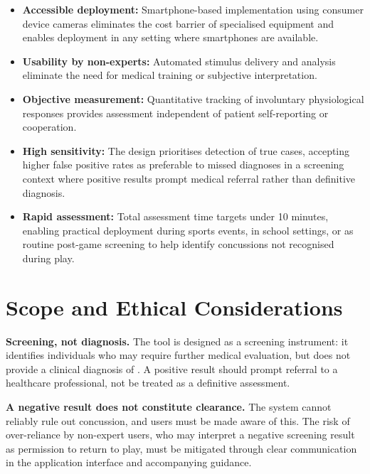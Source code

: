 \begin{itemize}
    \item \textbf{Accessible deployment:} Smartphone-based implementation using consumer device cameras eliminates the cost barrier of specialised equipment and enables deployment in any setting where smartphones are available.

    \item \textbf{Usability by non-experts:} Automated stimulus delivery and analysis eliminate the need for medical training or subjective interpretation.

    \item \textbf{Objective measurement:} Quantitative tracking of involuntary physiological responses provides assessment independent of patient self-reporting or cooperation.

    \item \textbf{High sensitivity:} The design prioritises detection of true  cases, accepting higher false positive rates as preferable to missed diagnoses in a screening context where positive results prompt medical referral rather than definitive diagnosis.

    \item \textbf{Rapid assessment:} Total assessment time targets under 10 minutes, enabling practical deployment during sports events, in school settings, or as routine post-game screening to help identify concussions not recognised during play.
\end{itemize}


\section{Scope and Ethical Considerations}

\textbf{Screening, not diagnosis.} The tool is designed as a screening instrument: it identifies individuals who may require further medical evaluation, but does not provide a clinical diagnosis of . A positive result should prompt referral to a healthcare professional, not be treated as a definitive assessment.

\textbf{A negative result does not constitute clearance.} The system cannot reliably rule out concussion, and users must be made aware of this. The risk of over-reliance by non-expert users, who may interpret a negative screening result as permission to return to play, must be mitigated through clear communication in the application interface and accompanying guidance.

